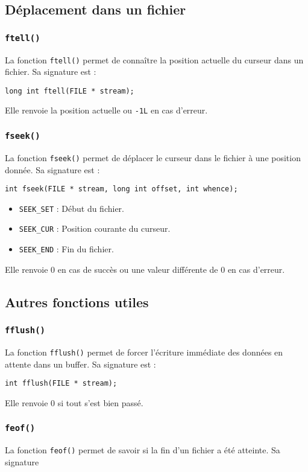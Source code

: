 \documentclass[french,11pt]{article}
\begin{document}
\subsection{Déplacement dans un fichier}

\subsubsection{\texttt{ftell()}}
La fonction \texttt{ftell()} permet de connaître la position actuelle du curseur dans un fichier. Sa signature est :
\begin{verbatim}
long int ftell(FILE * stream);
\end{verbatim}
Elle renvoie la position actuelle ou \texttt{-1L} en cas d’erreur.

\subsubsection{\texttt{fseek()}}
La fonction \texttt{fseek()} permet de déplacer le curseur dans le fichier à une position donnée. Sa signature est :
\begin{verbatim}
int fseek(FILE * stream, long int offset, int whence);
\end{verbatim}
\begin{itemize}
    \item \texttt{SEEK\_SET} : Début du fichier.
    \item \texttt{SEEK\_CUR} : Position courante du curseur.
    \item \texttt{SEEK\_END} : Fin du fichier.
\end{itemize}
Elle renvoie 0 en cas de succès ou une valeur différente de 0 en cas d'erreur.

\subsection{Autres fonctions utiles}

\subsubsection{\texttt{fflush()}}
La fonction \texttt{fflush()} permet de forcer l’écriture immédiate des données en attente dans un buffer. Sa signature est :
\begin{verbatim}
int fflush(FILE * stream);
\end{verbatim}
Elle renvoie 0 si tout s'est bien passé.

\subsubsection{\texttt{feof()}}
La fonction \texttt{feof()} permet de savoir si la fin d'un fichier a été atteinte. Sa signature
\end{document}
